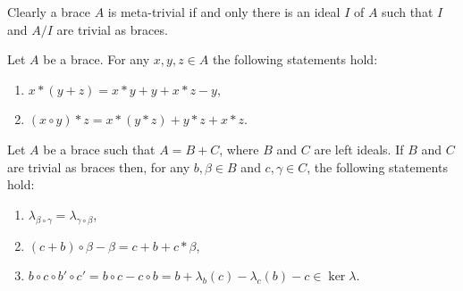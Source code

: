 Clearly a brace $A$ is meta-trivial if and only there is 
an ideal $I$ of $A$ such that $I$ and $A/I$ are trivial as braces.

\begin{lemma} 
\label{lem:calcbraces}
Let $A$ be a brace. For any $x,y,z \in A$ the following statements hold:
\begin{enumerate}
    \item $x*(y+z) = x*y +y +x*z -y$,
    \item $(x\circ y)*z = x*(y*z) + y*z + x*z$.
\end{enumerate}
\end{lemma}

\begin{lemma}\label{lem:calculations}
    Let $A$ be a brace such that $A = B+C$, where $B$ and $C$ are left ideals. If $B$ and $C$ are trivial as braces then,
    for any $b,\beta \in B$ and $c,\gamma \in C$, the following statements hold:
	\begin{enumerate}
	    \item $\lambda_{\beta \circ \gamma} = \lambda_{\gamma \circ \beta}$,
	    \item $(c + b) \circ \beta - \beta = c + b + c* \beta $,
	    \item $b\circ c \circ b' \circ c' = b \circ c - c\circ b = b + \lambda_b(c) - \lambda_c(b) -c \in \ker \lambda$.
	\end{enumerate}
\end{lemma}

